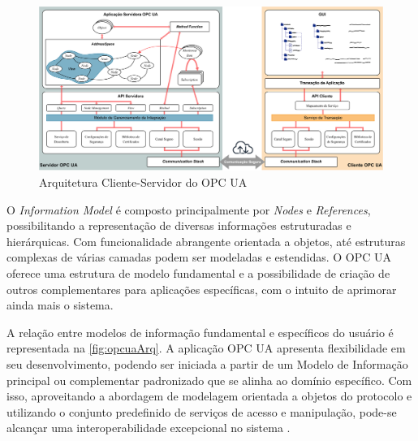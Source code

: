         \begin{figure}[htbp]
            \caption{Arquitetura Cliente-Servidor do OPC UA}
            \label{fig:opcuaArqCS}
            \begin{center}
                \includegraphics[width=1\linewidth]{USPSC-img/opcuaClientServerArc1.png}
            \end{center}
        \end{figure}

        O \textit{Information Model} é composto principalmente por \textit{Nodes} e \textit{References}, possibilitando a representação de diversas informações estruturadas e hierárquicas. Com funcionalidade abrangente orientada a objetos, até estruturas complexas de várias camadas podem ser modeladas e estendidas. O OPC UA oferece uma estrutura de modelo fundamental e a possibilidade de criação de outros complementares para aplicações específicas, com o intuito de aprimorar ainda mais o sistema.

        A relação entre modelos de informação fundamental e específicos do usuário é representada na \autoref{fig:opcuaArq}. A aplicação OPC UA apresenta flexibilidade em seu desenvolvimento, podendo ser iniciada a partir de um Modelo de Informação principal ou complementar padronizado que se alinha ao domínio específico. Com isso, aproveitando a abordagem de modelagem orientada a objetos do protocolo e utilizando o conjunto predefinido de serviços de acesso e manipulação, pode-se alcançar uma interoperabilidade excepcional no sistema \cite{gong2020}.

